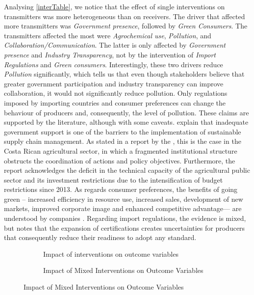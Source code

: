 Analysing \cref{interTable}, we notice that the effect of single interventions on transmitters was more heterogeneous than on receivers. The driver that affected more transmitters was \textit{Government presence}, followed by \textit{Green Consumers}. The transmitters affected the most were \textit{Agrochemical use}, \textit{Pollution}, and \textit{Collaboration/Communication}. The latter is only affected by \textit{Government presence} and \textit{Industry Transparency}, not by the intervention of \textit{Import Regulations} and \textit{Green consumers}. Interestingly, these two drivers reduce \textit{Pollution} significantly, which tells us that even though stakeholders believe that greater government participation and industry transparency can improve collaboration, it would not significantly reduce pollution. Only regulations imposed by importing countries and consumer preferences can change the behaviour of producers and, consequently, the level of pollution. These claims are supported by the literature, although with some caveats. \cite{sajjad2015sustainable} explain that inadequate government support is one of the barriers to the implementation of sustainable supply chain management. As stated in a report by the \cite{oecd2017oecd}, this is the case in the Costa Rican agricultural sector, in which a fragmented 
institutional structure obstructs the coordination of actions and policy objectives. Furthermore, the report acknowledges the deficit in the technical capacity of the agricultural public sector and its investment restrictions due to the intensification of budget restrictions since 2013. As regards consumer preferences, the benefits of going green -- increased efficiency in resource use, increased sales, development of new markets, improved corporate image and enhanced competitive advantage--- are understood by companies \citep{dangelico2010mainstreaming}. Regarding import regulations, the evidence is mixed, but \cite{montiel2019effect} notes that the expansion of certifications creates uncertainties for producers that consequently reduce their readiness to adopt any standard.

\begin{figure}[h]
\caption{Impact of (mixed) interventions on outcome variables} \label{interBars}
\begin{subfigure}[b]{0.45\textwidth}
  \centering
  
\caption{Impact of interventions on outcome variables} 
  \label{interventionBar}
\end{subfigure}%
  \hfill
\begin{subfigure}[b]{0.45\textwidth}
  \centering
  
\caption{Impact of Mixed Interventions on Outcome Variables}    
  \label{mixedBar}
\end{subfigure}
\end{figure}

